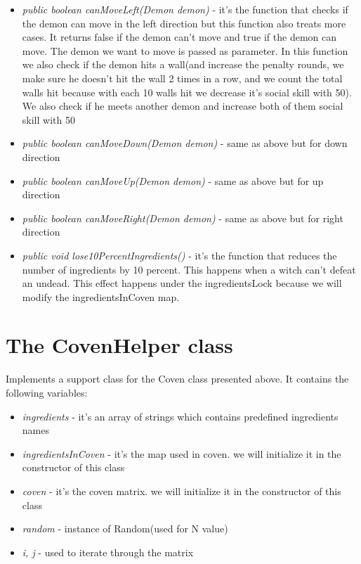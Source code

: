\documentclass[14pt]{article}
\begin{document}
\begin{itemize}
            \item \textit{public boolean canMoveLeft(Demon demon)} - it's the function that checks if the demon can move in the left direction but this function also treats more cases. It returns false if the demon can't move and true if the demon can move. The demon we want to move is passed as parameter. In this function we also check if the demon hits a wall(and increase the penalty rounds, we make sure he doesn't hit the wall 2 times in a row, and we count the total walls hit because with each 10 walls hit we decrease it's social skill with 50). We also check if he meets another demon and increase both of them social skill with 50
            \item \textit{public boolean canMoveDown(Demon demon)} - same as above but for down direction
            \item \textit{public boolean canMoveUp(Demon demon)} - same as above but for up direction
            \item \textit{public boolean canMoveRight(Demon demon)} - same as above but for right direction
            \item \textit{public void lose10PercentIngredients()} - it's the function that reduces the number of ingredients by 10 percent. This happens when a witch can't defeat an undead. This effect happens under the ingredientsLock because we will modify the ingredientsInCoven map.
\end{itemize}

\section*{The CovenHelper class}
\vspace{5 mm}
Implements a support class for the Coven class presented above.
It contains the following variables:\\ 
\begin{itemize}
            \item \textit{ingredients} - it's an array of strings which contains predefined ingredients names
            \item \textit{ingredientsInCoven} - it's the map used in coven. we will initialize it in the constructor of this class
            \item \textit{coven} - it's the coven matrix. we will initialize it in the constructor of this class
            \item \textit{random} - instance of Random(used for N value)
            \item \textit{i, j} - used to iterate through the matrix
\end{itemize}
\end{document}
